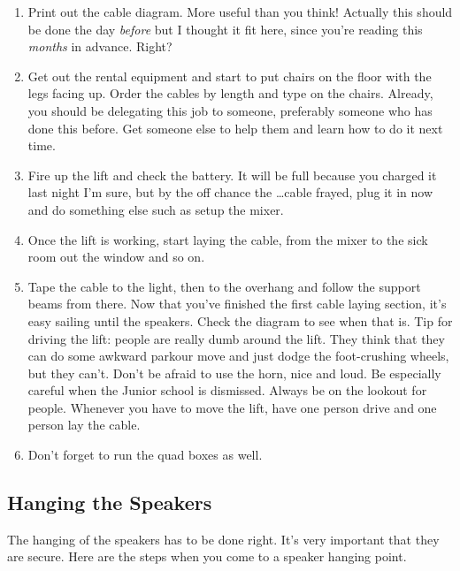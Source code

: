 \documentclass[letterpaper,10pt,oneside,headsepline]{scrreprt}
\begin{document}
\begin{enumerate}
\item Print out the cable diagram. More useful than you think! Actually this should be done the day \textit{before} but I thought it fit here, since you're reading this \textit{months} in advance. Right?
\item Get out the rental equipment and start to put chairs on the floor with the legs facing up. Order the cables by length and type on the chairs. Already, you should be delegating this job to someone, preferably someone who has done this before. Get someone else to help them and learn how to do it next time.
\item Fire up the lift and check the battery. It will be full because you charged it last night I'm sure, but by the off chance the \ldots cable frayed, plug it in now and do something else such as setup the mixer.
\item Once the lift is working, start laying the cable, from the mixer to the sick room out the window and so on.
\item Tape the cable to the light, then to the overhang and follow the support beams from there. Now that you've finished the first cable laying section, it's easy sailing until the speakers. Check the diagram to see when that is. Tip for driving the lift: people are really dumb around the lift. They think that they can do some awkward parkour move and just dodge the foot-crushing wheels, but they can't. Don't be afraid to use the horn, nice and loud. Be especially careful when the Junior school is dismissed. Always be on the lookout for people. Whenever you have to move the lift, have one person drive and one person lay the cable.
\item Don't forget to run the quad boxes as well.
\end{enumerate}

\subsection{Hanging the Speakers}
The hanging of the speakers has to be done right. It's very important that they are secure. Here are the steps when you come to a speaker hanging point.
\end{document}
